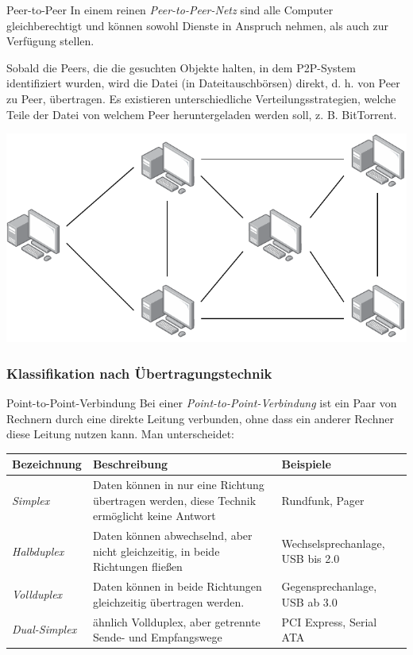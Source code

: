 \begin{defi}{Peer-to-Peer}
    In einem reinen \emph{Peer-to-Peer-Netz} sind alle Computer gleichberechtigt und können sowohl Dienste in Anspruch nehmen, als auch zur Verfügung stellen.

    Sobald die Peers, die die gesuchten Objekte halten, in dem P2P-System identifiziert wurden, wird die Datei (in Dateitauschbörsen) direkt, d. h. von Peer zu Peer, übertragen.
    Es existieren unterschiedliche Verteilungsstrategien, welche Teile der Datei von welchem Peer heruntergeladen werden soll, z. B. BitTorrent.

    \centering
    \includegraphics[width=.5\textwidth]{includes/figures/defi_peer_to_peer.pdf}
\end{defi}

\subsubsection{Klassifikation nach Übertragungstechnik}

\begin{defi}{Point-to-Point-Verbindung}
    Bei einer \emph{Point-to-Point-Verbindung} ist ein Paar von Rechnern durch eine direkte Leitung verbunden, ohne dass ein anderer Rechner diese Leitung nutzen kann.
    Man unterscheidet:

    \begin{tabularx}{\textwidth}{|l|X|X|}
        \hline
        Bezeichnung         & Beschreibung                                                                                & Beispiele                        \\
        \hline
        \hline
        \emph{Simplex}      & Daten können in nur eine Richtung übertragen werden, diese Technik ermöglicht keine Antwort & Rundfunk, Pager                  \\
        \hline
        \emph{Halbduplex}   & Daten können abwechselnd, aber nicht gleichzeitig, in beide Richtungen fließen              & Wechselsprechanlage, USB bis 2.0 \\
        \hline
        \emph{Vollduplex}   & Daten können in beide Richtungen gleichzeitig übertragen werden.                            & Gegensprechanlage, USB ab 3.0    \\
        \hline
        \emph{Dual-Simplex} & ähnlich Vollduplex, aber getrennte Sende- und Empfangswege                                  & PCI Express, Serial ATA          \\
        \hline
    \end{tabularx}
\end{defi}

